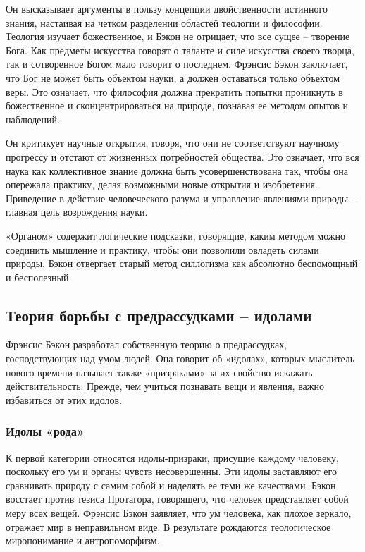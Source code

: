 \documentclass[a4paper, 14pt]{extreport}
\begin{document}
Он высказывает аргументы в пользу концепции двойственности истинного
знания, настаивая на четком разделении областей теологии и философии.
Теология изучает божественное, и Бэкон не отрицает, что все сущее --
творение Бога. Как предметы искусства говорят о таланте и силе искусства
своего творца, так и сотворенное Богом мало говорит о последнем. Фрэнсис
Бэкон заключает, что Бог не может быть объектом науки, а должен
оставаться только объектом веры. Это означает, что философия должна
прекратить попытки проникнуть в божественное и сконцентрироваться на
природе, познавая ее методом опытов и наблюдений.

Он критикует научные открытия, говоря, что они не соответствуют научному
прогрессу и отстают от жизненных потребностей общества. Это означает,
что вся наука как коллективное знание должна быть усовершенствована так,
чтобы она опережала практику, делая возможными новые открытия и
изобретения. Приведение в действие человеческого разума и управление
явлениями природы -- главная цель возрождения науки.

«Органом» содержит логические подсказки, говорящие, каким методом можно
соединить мышление и практику, чтобы они позволили овладеть силами
природы. Бэкон отвергает старый метод силлогизма как абсолютно
беспомощный и бесполезный.

\subsection{Теория борьбы с предрассудками -- идолами}

Фрэнсис Бэкон разработал собственную теорию о предрассудках,
господствующих над умом людей. Она говорит об «идолах», которых
мыслитель нового времени называет также «призраками» за их свойство
искажать действительность. Прежде, чем учиться познавать вещи и явления,
важно избавиться от этих идолов.

\subsubsection{Идолы «рода»}

К первой категории относятся идолы-призраки, присущие каждому человеку,
поскольку его ум и органы чувств несовершенны. Эти идолы заставляют его
сравнивать природу с самим собой и наделять ее теми же качествами. Бэкон
восстает против тезиса Протагора, говорящего, что человек представляет
собой меру всех вещей. Фрэнсис Бэкон заявляет, что ум человека, как
плохое зеркало, отражает мир в неправильном виде. В результате рождаются
теологическое миропонимание и антропоморфизм.
\end{document}
